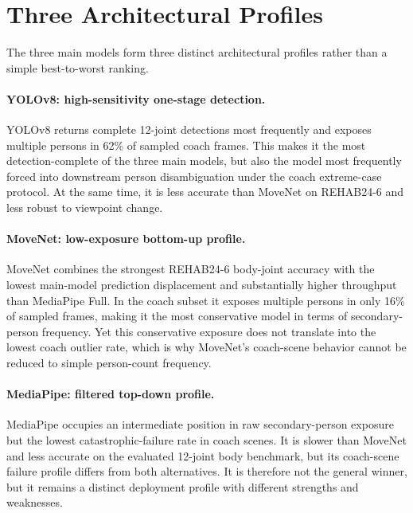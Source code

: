\section{Three Architectural Profiles}
\label{sec:arch-comparison}

The three main models form three distinct architectural profiles rather than a simple best-to-worst ranking.

\paragraph{YOLOv8: high-sensitivity one-stage detection.}
YOLOv8 returns complete 12-joint detections most frequently and exposes multiple persons in 62\% of sampled coach frames. This makes it the most detection-complete of the three main models, but also the model most frequently forced into downstream person disambiguation under the coach extreme-case protocol. At the same time, it is less accurate than MoveNet on REHAB24-6 and less robust to viewpoint change.

\paragraph{MoveNet: low-exposure bottom-up profile.}
MoveNet combines the strongest REHAB24-6 body-joint accuracy with the lowest main-model prediction displacement and substantially higher throughput than MediaPipe Full. In the coach subset it exposes multiple persons in only 16\% of sampled frames, making it the most conservative model in terms of secondary-person frequency. Yet this conservative exposure does not translate into the lowest coach outlier rate, which is why MoveNet's coach-scene behavior cannot be reduced to simple person-count frequency.

\paragraph{MediaPipe: filtered top-down profile.}
MediaPipe occupies an intermediate position in raw secondary-person exposure but the lowest catastrophic-failure rate in coach scenes. It is slower than MoveNet and less accurate on the evaluated 12-joint body benchmark, but its coach-scene failure profile differs from both alternatives. It is therefore not the general winner, but it remains a distinct deployment profile with different strengths and weaknesses.

